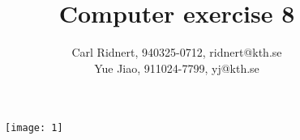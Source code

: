 \documentclass[11pt,a4paper,roman]{scrartcl}
\title{Computer exercise 8}
\date{}
\author{Carl Ridnert, 940325-0712, ridnert@kth.se \\
Yue Jiao, 911024-7799, yj@kth.se}
\begin{document}
\maketitle
\begin{figure}[h]
\centering
\texttt{[image: 1]}
\end{figure}


\newpage
\end{document}
